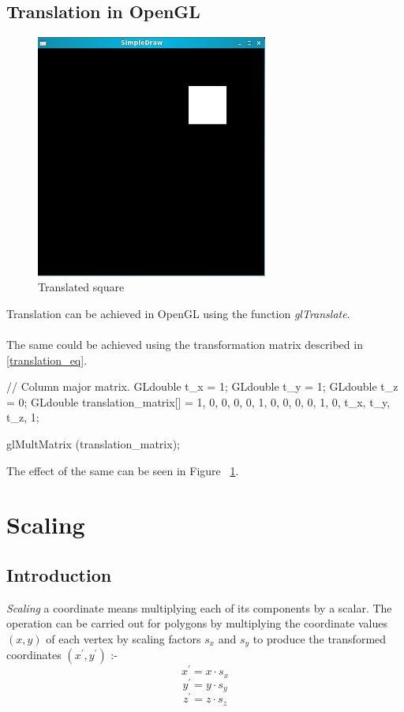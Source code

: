 \documentclass[a4paper,12pt,titlepage,twosided]{article}
\begin{document}
	\subsection{Translation in OpenGL}
		\begin{figure}
			\centering
			\includegraphics[height=80mm]{Images_final/Translated_square.jpg}
			\caption{Translated square}
			\label{fig:translated}
		\end{figure}
		Translation can be achieved in OpenGL using the function \emph{glTranslate}. \\ \\
		The same could be achieved using the transformation matrix described in \eqref{translation_eq}.
		\begin{code}
			// Column major matrix.
			GLdouble t_x = 1;
			GLdouble t_y = 1;
			GLdouble t_z = 0;
			GLdouble translation_matrix[] = { 1, 0, 0, 0,
							  0, 1, 0, 0,
							  0, 0, 1, 0,
							  t_x, t_y, t_z, 1};	

			glMultMatrix (translation_matrix);
		\end{code}
		The effect of the same can be seen in Figure ~\ref{fig:translated}.
	
		
\pagebreak
\pagebreak
\section{Scaling}
	\subsection{Introduction}
	\emph{Scaling} a coordinate means multiplying each of its components by a scalar. The operation can be carried out for polygons by multiplying the coordinate values $(x,y)$ of each vertex by scaling factors $s_x$ and $s_y$ to produce the transformed coordinates $(x^{'},y^{'})$ :-
	\begin{equation*}
		x^{'} = x \cdot s_x 
	\end{equation*}
	\begin{equation*}
		y^{'} = y \cdot s_y
	\end{equation*}
	\begin{equation*}
		z^{'} = z \cdot s_z
	\end{equation*}
\end{document}
